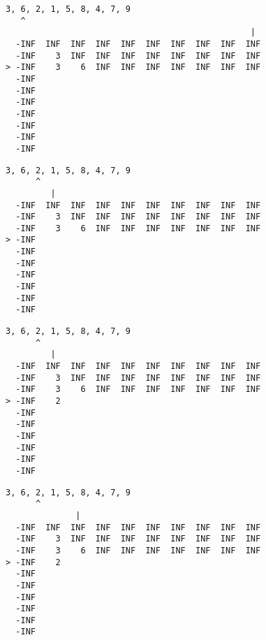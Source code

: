 { \begin{verbatim}
3, 6, 2, 1, 5, 8, 4, 7, 9
   ^
                                                 |
  -INF  INF  INF  INF  INF  INF  INF  INF  INF  INF
  -INF    3  INF  INF  INF  INF  INF  INF  INF  INF
> -INF    3    6  INF  INF  INF  INF  INF  INF  INF
  -INF                                             
  -INF                                             
  -INF                                             
  -INF                                             
  -INF                                             
  -INF                                             
  -INF                                             
\end{verbatim} }

{ \begin{verbatim}
3, 6, 2, 1, 5, 8, 4, 7, 9
      ^
         |
  -INF  INF  INF  INF  INF  INF  INF  INF  INF  INF
  -INF    3  INF  INF  INF  INF  INF  INF  INF  INF
  -INF    3    6  INF  INF  INF  INF  INF  INF  INF
> -INF                                             
  -INF                                             
  -INF                                             
  -INF                                             
  -INF                                             
  -INF                                             
  -INF                                             
\end{verbatim} }

{ \begin{verbatim}
3, 6, 2, 1, 5, 8, 4, 7, 9
      ^
         |
  -INF  INF  INF  INF  INF  INF  INF  INF  INF  INF
  -INF    3  INF  INF  INF  INF  INF  INF  INF  INF
  -INF    3    6  INF  INF  INF  INF  INF  INF  INF
> -INF    2                                        
  -INF                                             
  -INF                                             
  -INF                                             
  -INF                                             
  -INF                                             
  -INF                                             
\end{verbatim} }

{ \begin{verbatim}
3, 6, 2, 1, 5, 8, 4, 7, 9
      ^
              |
  -INF  INF  INF  INF  INF  INF  INF  INF  INF  INF
  -INF    3  INF  INF  INF  INF  INF  INF  INF  INF
  -INF    3    6  INF  INF  INF  INF  INF  INF  INF
> -INF    2                                        
  -INF                                             
  -INF                                             
  -INF                                             
  -INF                                             
  -INF                                             
  -INF                                             
\end{verbatim} }

